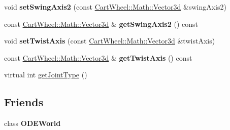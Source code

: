 \begin{DoxyCompactItemize}
\item 
\hypertarget{classCartWheel_1_1Physics_1_1BallInSocketJoint_a499de40cda9a9fe0c9ffa47f7a3897e4}{
void {\bfseries setSwingAxis2} (const \hyperlink{classCartWheel_1_1Math_1_1Vector3d}{CartWheel::Math::Vector3d} \&swingAxis2)}
\label{classCartWheel_1_1Physics_1_1BallInSocketJoint_a499de40cda9a9fe0c9ffa47f7a3897e4}

\item 
\hypertarget{classCartWheel_1_1Physics_1_1BallInSocketJoint_ac24e976a8353f44350e95c829b470609}{
const \hyperlink{classCartWheel_1_1Math_1_1Vector3d}{CartWheel::Math::Vector3d} \& {\bfseries getSwingAxis2} () const }
\label{classCartWheel_1_1Physics_1_1BallInSocketJoint_ac24e976a8353f44350e95c829b470609}

\item 
\hypertarget{classCartWheel_1_1Physics_1_1BallInSocketJoint_ae398fc97a567a3f728adee22676072c0}{
void {\bfseries setTwistAxis} (const \hyperlink{classCartWheel_1_1Math_1_1Vector3d}{CartWheel::Math::Vector3d} \&twistAxis)}
\label{classCartWheel_1_1Physics_1_1BallInSocketJoint_ae398fc97a567a3f728adee22676072c0}

\item 
\hypertarget{classCartWheel_1_1Physics_1_1BallInSocketJoint_a0658aeff4f225fc45b3e979487a83d31}{
const \hyperlink{classCartWheel_1_1Math_1_1Vector3d}{CartWheel::Math::Vector3d} \& {\bfseries getTwistAxis} () const }
\label{classCartWheel_1_1Physics_1_1BallInSocketJoint_a0658aeff4f225fc45b3e979487a83d31}

\item 
virtual int \hyperlink{classCartWheel_1_1Physics_1_1BallInSocketJoint_a8d42a8e2cd4e5b84b951411aa6344721}{getJointType} ()
\end{DoxyCompactItemize}
\subsection*{Friends}
\begin{DoxyCompactItemize}
\item 
\hypertarget{classCartWheel_1_1Physics_1_1BallInSocketJoint_a5db30e1aef955cb40c04658eacff8680}{
class {\bfseries ODEWorld}}
\label{classCartWheel_1_1Physics_1_1BallInSocketJoint_a5db30e1aef955cb40c04658eacff8680}

\end{DoxyCompactItemize}


